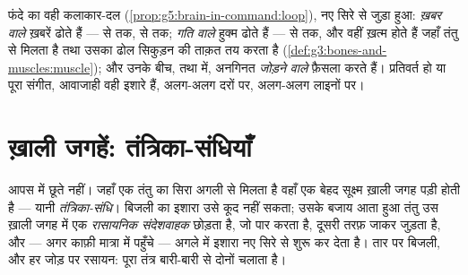 \begin{example}[तीन लाइनें, एक ही भाषा]\label{ex:g8:nervous-communication:lines}
फंदे का वही कलाकार-दल (\cref{prop:g5:brain-in-command:loop}), नए सिरे
से जुड़ा हुआ: \emph{ख़बर वाले } ख़बरें ढोते हैं ---  से
 तक,  से  तक; \emph{गति वाले } हुक्म ढोते
हैं ---  से  तक, और वहीं ख़त्म होते हैं जहाँ तंतु  से
मिलता है तथा उसका ढोल सिकुड़न की ताक़त तय करता है
(\cref{def:g3:bones-and-muscles:muscle}); और उनके बीच,  तथा
 में, अनगिनत \emph{जोड़ने वाले } फ़ैसला करते हैं।
प्रतिवर्त हो या पूरा संगीत, आवाजाही वही इशारे हैं, अलग-अलग दरों पर,
अलग-अलग लाइनों पर।
\end{example}

\section{ख़ाली जगहें: तंत्रिका-संधियाँ}

\begin{definition}[तंत्रिका-संधि]\label{def:g8:nervous-communication:synapse}
 आपस में छूते नहीं। जहाँ एक तंतु का सिरा अगली  से मिलता है
वहाँ एक बेहद सूक्ष्म ख़ाली जगह पड़ी होती है --- यानी
\emph{तंत्रिका-संधि}। बिजली का इशारा उसे कूद नहीं
सकता; उसके बजाय आता हुआ तंतु उस ख़ाली जगह में एक \emph{रासायनिक
संदेशवाहक} छोड़ता है, जो पार करता है, दूसरी तरफ़ जाकर जुड़ता है, और ---
अगर काफ़ी मात्रा में पहुँचे --- अगले  में इशारा नए सिरे से शुरू कर
देता है। तार पर बिजली, और हर जोड़ पर रसायन: पूरा तंत्र बारी-बारी से
दोनों चलाता है।
\end{definition}

